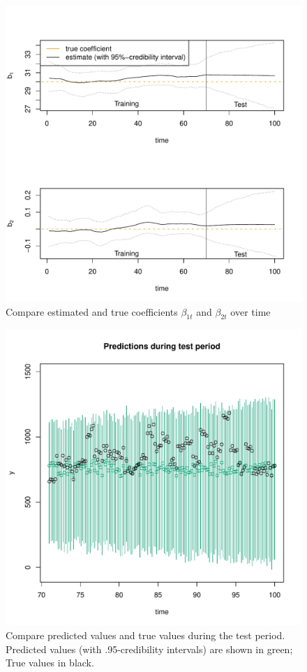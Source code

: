 \documentclass{article}
\begin{document}
\begin{figure}
	\centering
	\includegraphics[width=\textwidth]{coefficients_over_time.pdf}
	\caption{Compare estimated and true coefficients $\beta_{1t}$ and $\beta_{2t}$ over time}
	\label{fig:fig3}
\end{figure}

\begin{figure}
	\centering
	\includegraphics[width=\textwidth]{compare_predictions_with_simulated_data.pdf}
	\caption{Compare predicted values and true values during the test period. Predicted values (with .95-credibility intervals) are shown in green; True values in black.}
	\label{fig:fig4}
\end{figure}
\end{document}
